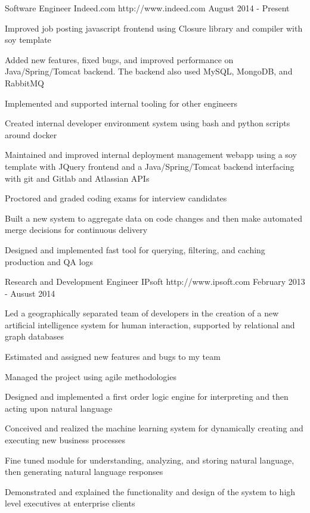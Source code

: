 \documentclass[11pt, a4paper]{awesome-cv}
\begin{document}
\makecvheader

\begin{cventries}
    \cventry
    {Software Engineer}
    {Indeed.com}
    {http://www.indeed.com}
    {August 2014 - Present}
    {
      \begin{cvitems}
        \item {Improved job posting javascript frontend using Closure library and compiler with soy template}\item {Added new features, fixed bugs, and improved performance on Java/Spring/Tomcat backend. The backend also used MySQL, MongoDB, and RabbitMQ}\item {Implemented and supported internal tooling for other engineers}\item {Created internal developer environment system using bash and python scripts around docker}\item {Maintained and improved internal deployment management webapp using a soy template with JQuery frontend and a Java/Spring/Tomcat backend interfacing with git and Gitlab and Atlassian APIs}\item {Proctored and graded coding exams for interview candidates}\item {Built a new system to aggregate data on code changes and then make automated merge decisions for continuous delivery}\item {Designed and implemented fast tool for querying, filtering, and caching production and QA logs}
      \end{cvitems}
    }
    \cventry
    {Research and Development Engineer}
    {IPsoft}
    {http://www.ipsoft.com}
    {February 2013 - Ausust 2014}
    {
      \begin{cvitems}
        \item {Led a geographically separated team of developers in the creation of a new artificial intelligence system for human interaction, supported by relational and graph databases}\item {Estimated and assigned new features and bugs to my team}\item {Managed the project using agile methodologies}\item {Designed and implemented a first order logic engine for interpreting and then acting upon natural language}\item {Conceived and realized the machine learning system for dynamically creating and executing new business processes}\item {Fine tuned module for understanding, analyzing, and storing natural language, then generating natural language responses}\item {Demonstrated and explained the functionality and design of the system to high level executives at enterprise clients}

\end{cvitems}}
\end{cventries}
\end{document}

